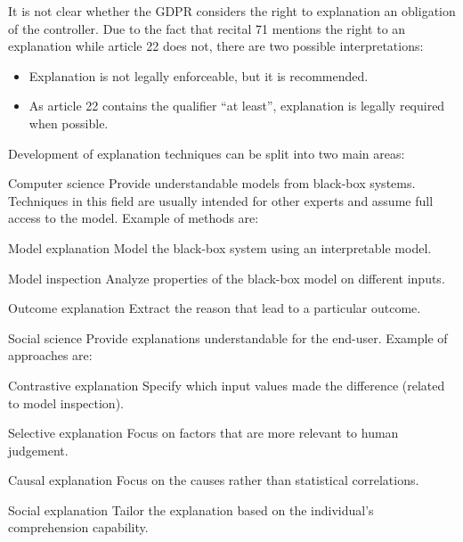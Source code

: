 It is not clear whether the GDPR considers the right to explanation an obligation of the controller. Due to the fact that recital 71 mentions the right to an explanation while article 22 does not, there are two possible interpretations:
\begin{itemize}
    \item Explanation is not legally enforceable, but it is recommended.
    \item As article 22 contains the qualifier ``at least'', explanation is legally required when possible.
\end{itemize} 

\begin{remark}
    Development of explanation techniques can be split into two main areas:
    \begin{descriptionlist}
        \item[Computer science] 
            Provide understandable models from black-box systems. Techniques in this field are usually intended for other experts and assume full access to the model. Example of methods are:
            \begin{descriptionlist}
                \item[Model explanation] Model the black-box system using an interpretable model.
                \item[Model inspection] Analyze properties of the black-box model on different inputs.
                \item[Outcome explanation] Extract the reason that lead to a particular outcome.
            \end{descriptionlist}

        \item[Social science] 
            Provide explanations understandable for the end-user. Example of approaches are:
            \begin{descriptionlist}
                \item[Contrastive explanation] Specify which input values made the difference (related to model inspection).
                \item[Selective explanation] Focus on factors that are more relevant to human judgement.
                \item[Causal explanation] Focus on the causes rather than statistical correlations.
                \item[Social explanation] Tailor the explanation based on the individual's comprehension capability.
            \end{descriptionlist}
    \end{descriptionlist}
\end{remark}


